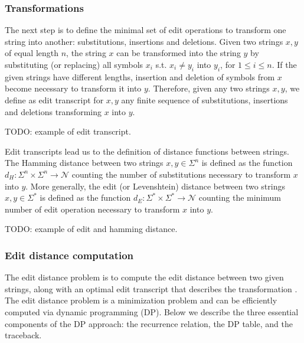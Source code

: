 \subsubsection{Transformations}

The next step is to define the minimal set of edit operations to transform one string into another: substitutions, insertions and deletions.
Given two strings $x,y$ of equal length $n$, the string $x$ can be transformed into the string $y$ by substituting (or replacing) all symbols $x_i$ s.t. $x_i \neq y_i$ into $y_i$, for $1 \leq i \leq n$.
If the given strings have different lengths, insertion and deletion of symbols from $x$ become necessary to transform it into $y$.
Therefore, given any two strings $x,y$, we define as edit transcript for $x,y$ any finite sequence of substitutions, insertions and deletions transforming $x$ into $y$.

\begin{example}
TODO: example of edit transcript.
\end{example}

Edit transcripts lead us to the definition of distance functions between strings.
The Hamming distance between two strings $x,y \in \Sigma^{n}$ is defined as the function $d_H : \Sigma^{n} \times \Sigma^{n} \rightarrow \mathcal{N}$ counting the number of substitutions necessary to transform $x$ into $y$.
More generally, the edit (or Levenshtein) distance between two strings $x,y \in \Sigma^{*}$ is defined as the function $d_E : \Sigma^{*} \times \Sigma^{*} \rightarrow \mathcal{N}$ counting the minimum number of edit operation necessary to transform $x$ into $y$.

\begin{example}
TODO: example of edit and hamming distance.
\end{example}

\subsubsection{Edit distance computation}

The edit distance problem is to compute the edit distance between two given strings, along with an optimal edit transcript that describes the transformation \cite{Gusfield1997}.
The edit distance problem is a minimization problem and can be efficiently computed via dynamic programming (DP). Below we describe the three essential components of the DP approach: the recurrence relation, the DP table, and the traceback.

